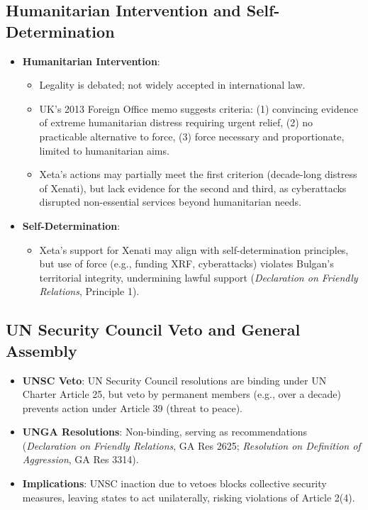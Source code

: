 \subsection{Humanitarian Intervention and Self-Determination}
\begin{itemize}
    \item \textbf{Humanitarian Intervention}:
    \begin{itemize}
        \item Legality is debated; not widely accepted in international law.
        \item UK’s 2013 Foreign Office memo suggests criteria: (1) convincing evidence of extreme humanitarian distress requiring urgent relief, (2) no practicable alternative to force, (3) force necessary and proportionate, limited to humanitarian aims.
        \item Xeta’s actions may partially meet the first criterion (decade-long distress of Xenati), but lack evidence for the second and third, as cyberattacks disrupted non-essential services beyond humanitarian needs.
    \end{itemize}
    \item \textbf{Self-Determination}:
    \begin{itemize}
        \item Xeta’s support for Xenati may align with self-determination principles, but use of force (e.g., funding XRF, cyberattacks) violates Bulgan’s territorial integrity, undermining lawful support (\textit{Declaration on Friendly Relations}, Principle 1).
    \end{itemize}
\end{itemize}

\subsection{UN Security Council Veto and General Assembly}
\begin{itemize}
    \item \textbf{UNSC Veto}: UN Security Council resolutions are binding under UN Charter Article 25, but veto by permanent members (e.g., over a decade) prevents action under Article 39 (threat to peace).
    \item \textbf{UNGA Resolutions}: Non-binding, serving as recommendations (\textit{Declaration on Friendly Relations}, GA Res 2625; \textit{Resolution on Definition of Aggression}, GA Res 3314).
    \item \textbf{Implications}: UNSC inaction due to vetoes blocks collective security measures, leaving states to act unilaterally, risking violations of Article 2(4).
\end{itemize}

